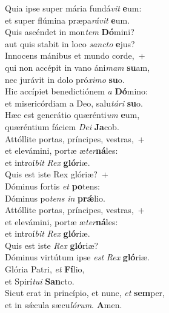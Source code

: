 \evenverse Quia ipse super mária fundá\textit{vit} \textbf{e}um:~\*\\
\evenverse et super flúmina præpa\textit{rá}\textit{vit} \textbf{e}um.\\
\oddverse Quis ascéndet in mon\textit{tem} \textbf{Dó}mini?~\*\\
\oddverse aut quis stabit in loco \textit{san}\textit{cto} \textbf{e}jus?\\
\evenverse Innocens mánibus et mundo corde,~+\\
\evenverse  qui non accépit in vano áni\textit{mam} \textbf{su}am,~\*\\
\evenverse nec jurávit in dolo pró\textit{xi}\textit{mo} \textbf{su}o.\\
\oddverse Hic accípiet benedictiónem \textit{a} \textbf{Dó}mino:~\*\\
\oddverse et misericórdiam a Deo, salu\textit{tá}\textit{ri} \textbf{su}o.\\
\evenverse Hæc est generátio quærénti\textit{um} \textbf{e}um,~\*\\
\evenverse quæréntium fáciem \textit{De}\textit{i} \textbf{Ja}cob.\\
\oddverse Attóllite portas, príncipes, vestras,~+\\
\oddverse  et elevámini, portæ æ\textit{ter}\textbf{ná}les:~\*\\
\oddverse et introí\textit{bit} \textit{Rex} \textbf{gló}riæ.\\
\evenverse Quis est iste Rex glóriæ?~+\\
\evenverse  Dóminus fortis \textit{et} \textbf{po}tens:~\*\\
\evenverse Dóminus po\textit{tens} \textit{in} \textbf{prǽ}lio.\\
\oddverse Attóllite portas, príncipes, vestras,~+\\
\oddverse  et elevámini, portæ æ\textit{ter}\textbf{ná}les:~\*\\
\oddverse et introí\textit{bit} \textit{Rex} \textbf{gló}riæ.\\
\evenverse Quis est iste \textit{Rex} \textbf{gló}riæ?~\*\\
\evenverse Dóminus virtútum ipse \textit{est} \textit{Rex} \textbf{gló}riæ.\\
\oddverse Glória Patri, \textit{et} \textbf{Fí}lio,~\*\\
\oddverse et Spirí\textit{tu}\textit{i} \textbf{San}cto.\\
\evenverse Sicut erat in princípio, et nunc, \textit{et} \textbf{sem}per,~\*\\
\evenverse et in sǽcula sæcu\textit{ló}\textit{rum}. \textbf{A}men.\\
